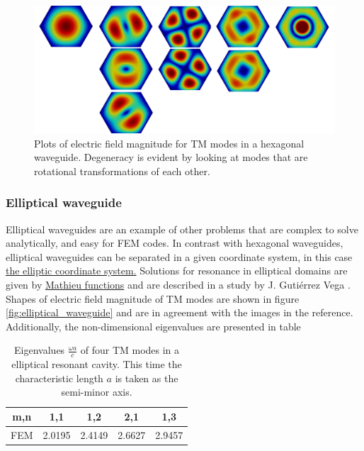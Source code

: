 \begin{figure}
\centering
\includegraphics[scale=0.07]{./img/hexagonal_waveguide.pdf}
\caption{Plots of electric field magnitude for TM modes in a hexagonal waveguide. Degeneracy is evident by looking at modes that are rotational transformations of each other.}
\label{fig:hexagonal_waveguide}
\end{figure}
\subsubsection{Elliptical waveguide}

Elliptical waveguides are an example of other problems that are complex to solve analytically, and easy for FEM codes. In contrast with hexagonal waveguides, elliptical waveguides can be separated in a given coordinate system, in this case \href{http://en.wikipedia.org/wiki/Elliptic_coordinate_system}{the elliptic coordinate system.} Solutions for resonance in elliptical domains are given by \href{http://en.wikipedia.org/wiki/Mathieu_function}{Mathieu functions} and are described in a study by J. Guti\'errez Vega \cite{J.Gutierrez-Vega1999}. Shapes of electric field magnitude of TM modes are shown in figure \ref{fig:elliptical_waveguide} and are in agreement with the images in the reference. Additionally, the non-dimensional eigenvalues are presented in table
\begin{table}
\begin{center}
\begin{tabular}{|c|c|c|c|c|}
\hline 
m,n & 1,1 & 1,2 & 2,1 & 1,3 \\ 
\hline 
FEM   & 2.0195 & 2.4149 & 2.6627 & 2.9457 \\ 
\hline 
\end{tabular} 
\label{tab:eli_wav_comparison}
\caption{Eigenvalues $\frac{\omega a}{c}$ of four TM modes in a elliptical resonant cavity. This time the characteristic length $a$ is taken as the semi-minor axis.}
\end{center}
\end{table}

